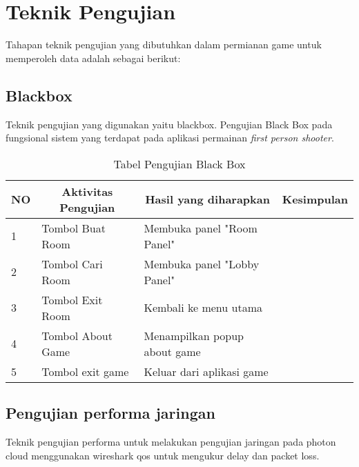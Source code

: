 \section{Teknik Pengujian}
\noindent

Tahapan teknik pengujian yang dibutuhkan dalam permianan game 
\judulId untuk memperoleh data adalah sebagai berikut:

\subsection{Blackbox}
Teknik pengujian yang digunakan yaitu blackbox. Pengujian Black Box pada fungsional sistem yang terdapat pada aplikasi permainan \textit{first person shooter}.

    \begin{table}[h]
    \centering
    \caption{Tabel Pengujian Black Box}
    \label{lab:tabel-pengujian}
    \begin{tabular}{|l|l|l|l|}
    \hline
    \multicolumn{1}{|c|}{NO} & \multicolumn{1}{c|}{Aktivitas Pengujian} & \multicolumn{1}{c|}{Hasil yang diharapkan} & \multicolumn{1}{c|}{Kesimpulan} \\ \hline
    1                        & Tombol Buat Room                         & Membuka panel "Room Panel"                 &                                 \\ \hline
    2                        & Tombol Cari Room                         & Membuka panel "Lobby Panel"                &                                 \\ \hline
    3                        & Tombol Exit Room                         & Kembali ke menu utama                      &                                 \\ \hline
    4                        & Tombol About Game                        & Menampilkan popup about game               &                                 \\ \hline
    5                        & Tombol exit game                         & Keluar dari aplikasi game                  &                                 \\ \hline
    \end{tabular}
    \end{table}
\newpage        
\subsection{Pengujian performa jaringan}
\noindent

Teknik pengujian performa untuk melakukan pengujian jaringan pada photon cloud menggunakan wireshark qos untuk mengukur delay dan packet loss.
